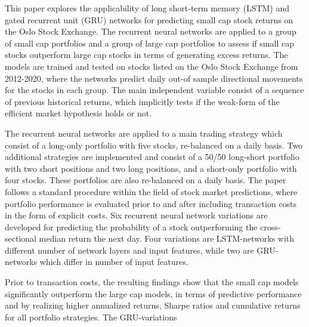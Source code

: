 This paper explores the applicability of long short-term memory (LSTM) and gated recurrent unit (GRU) networks for predicting small cap stock returns on the Oslo Stock Exchange. The recurrent neural networks are applied to a group of small cap portfolios  and a group of large cap portfolios to assess if small cap stocks outperform large cap stocks in terms of generating excess returns. The models are trained and tested on stocks listed on the Oslo Stock Exchange from 2012-2020, where the networks predict daily out-of sample directional movements for the stocks in each group. The main independent variable consist of a sequence of previous historical returns, which implicitly tests if the weak-form of the efficient market hypothesis holds or not. 

\indent\newline
The recurrent neural networks are applied to a main trading strategy which consist of a long-only portfolio with five stocks, re-balanced on a daily basis. Two additional strategies are implemented and consist of a 50/50 long-short portfolio with two short positions and two long positions, and a short-only portfolio with four stocks. These portfolios are also re-balanced on a daily basis. The paper follows a standard procedure within the field of stock market predictions, where portfolio performance is evaluated prior to and after including transaction costs in the form of explicit costs. Six recurrent neural network variations are developed for predicting the probability of a stock outperforming the cross-sectional median return the next day. Four variations are LSTM-networks with different number of network layers and input features, while two are GRU-networks which differ in number of input features. 

\indent\newline
Prior to transaction costs, the resulting findings show that the small cap models significantly outperform the large cap models, in terms of predictive performance and by realizing higher annualized returns, Sharpe ratios and cumulative returns for all portfolio strategies. The GRU-variations            